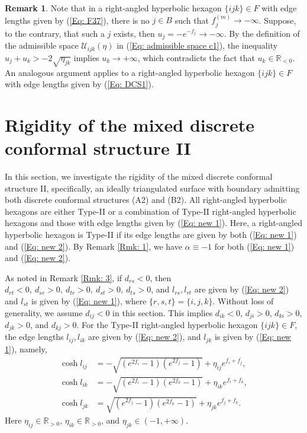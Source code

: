 \documentclass[12pt]{amsart}
\theoremstyle{definition}
\newtheorem{remark}[theorem]{Remark}
\begin{document}
\begin{remark}
Note that in a right-angled hyperbolic hexagon $\{ijk\}\in F$ with edge lengths given by (\ref{Eq: F37}),
there is no $j\in B$ such that $f_j^{(m)}\rightarrow -\infty$.
Suppose, to the contrary, that such a $j$ exists, 
then $u_j=-e^{-f_j}\rightarrow -\infty$.
By the definition of the admissible space $\mathcal{U}_{ijk}(\eta)$ in (\ref{Eq: admissible space c1}),
the inequality $u_j+u_k>-2\sqrt{\eta_{jk}}$ implies $u_k\rightarrow +\infty$, which contradicts the fact that $u_k\in \mathbb{R}_{<0}$.
An analogous argument applies to a right-angled hyperbolic hexagon $\{ijk\}\in F$ with edge lengths given by (\ref{Eq: DCS1}).
\end{remark}


\section{Rigidity of the mixed discrete conformal structure II}\label{section II}

In this section, we investigate the rigidity of the mixed discrete conformal structure II, specifically,
an ideally triangulated surface with boundary admitting both discrete conformal structures (A2) and (B2). 
All right-angled hyperbolic hexagons are either Type-II or a combination of Type-II right-angled hyperbolic hexagons and those with edge lengths given by (\ref{Eq: new 1}).
Here, a right-angled hyperbolic hexagon is Type-II if its edge lengths are given by both (\ref{Eq: new 1}) and (\ref{Eq: new 2}).
By Remark \ref{Rmk: 1}, we have $\alpha\equiv -1$ for both (\ref{Eq: new 1}) and (\ref{Eq: new 2}).

As noted in Remark \ref{Rmk: 3},
if $d_{rs}<0$, then $d_{rt}<0,\ d_{sr}>0,\ d_{tr}>0,\ d_{st}>0,\ d_{ts}>0$,
and $l_{rs}, l_{rt}$ are given by (\ref{Eq: new 2}) and $l_{st}$ is given by (\ref{Eq: new 1}),
where $\{r,s,t\}=\{i,j,k\}$.
Without loss of generality,
we assume $d_{ij}<0$ in this section.
This implies $d_{ik}<0$, $d_{ji}>0$, $d_{ki}>0$, $d_{jk}>0$, and $d_{kj}>0$.
For the Type-II right-angled hyperbolic hexagon $\{ijk\}\in F$, the edge lengths $l_{ij},l_{ik}$ are given by (\ref{Eq: new 2}), and $l_{jk}$ is given by (\ref{Eq: new 1}), namely,
\begin{equation}\label{Eq: F39}
\begin{aligned}
\cosh l_{ij}
&=-\sqrt{(e^{2f_i}-1)(e^{2f_j}-1)}
+\eta_{ij}e^{f_i+f_j},\\
\cosh l_{ik}
&=-\sqrt{(e^{2f_i}-1)(e^{2f_k}-1)}+\eta_{ik}e^{f_i+f_k},\\
\cosh l_{jk}
&=\sqrt{(e^{2f_j}-1)(e^{2f_k}-1)}+\eta_{jk}e^{f_j+f_k}.
\end{aligned}
\end{equation}
Here $\eta_{ij}\in \mathbb{R}_{>0}$, $\eta_{ik}\in \mathbb{R}_{>0}$, and $\eta_{jk}\in (-1,+\infty)$.
\end{document}
